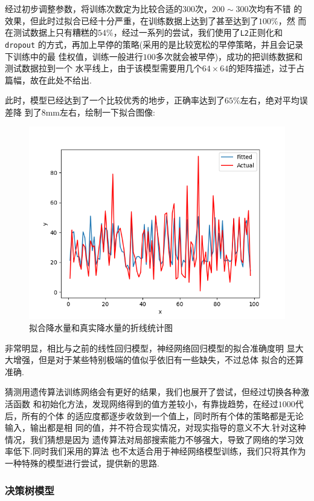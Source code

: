 \documentclass[UTF8, a4paper]{ctexart}
\begin{document}
经过初步调整参数，将训练次数定为比较合适的$300$次，$200\sim300$次均有不错
的效果，但此时过拟合已经十分严重，在训练数据上达到了甚至达到了$100\%$，然
而在测试数据上只有糟糕的$54\%$，经过一系列的尝试，我们使用了\verb+L2+正则化和\verb+dropout+
的方式，再加上早停的策略(采用的是比较宽松的早停策略，并且会记录下训练中的最
佳权值，训练一般进行$100$多次就会被早停)，成功的把训练数据和测试数据拉到一个
水平线上，由于该模型需要用几个$64\times64$的矩阵描述，过于占篇幅，故在此处不给出.

此时，模型已经达到了一个比较优秀的地步，正确率达到了$65\%$左右，绝对平均误差降
到了$8$\si{\milli\meter}左右，绘制一下拟合图像:

\begin{figure}[h!]
	\centering
	\includegraphics[scale=0.3]{success.png}
	\caption{拟合降水量和真实降水量的折线统计图}
\end{figure}

非常明显，相比与之前的线性回归模型，神经网络回归模型的拟合准确度明
显大大增强，但是对于某些特别极端的值似乎依旧有一些缺失，不过总体
拟合的还算准确.

猜测用遗传算法训练网络会有更好的结果，我们也展开了尝试，但经过切换各种激活函数
和初始化方法，发现网络得到的值方差较小，有靠拢趋势，在经过$1000$代后，所有的个体
的适应度都逐步收敛到一个值上，同时所有个体的策略都是无论输入，输出都是相
同的值，并不符合现实情况，对现实指导的意义不大.针对这种情况，我们猜想是因为
遗传算法对局部搜索能力不够强大，导致了网络的学习效率低下.同时我们采用的算法
也不太适合用于神经网络模型训练，我们只将其作为一种特殊的模型进行尝试，提供新的思路.

\subsubsection{决策树模型}
\end{document}
